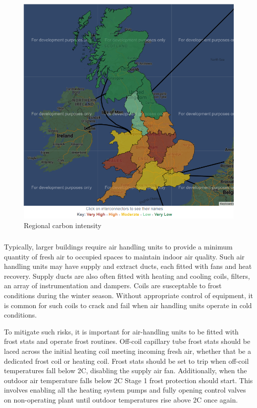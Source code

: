 \documentclass[11pt, oneside]{book}   	%
\begin{document}
\FloatBarrier
\begin{figure}[h]
\begin{center}
\includegraphics[width=1\textwidth]{regionalCarbonIntensity.png}
\caption{Regional carbon intensity}
\label{Regional Carbon Intensity figure}
\end{center}
\end{figure}
\FloatBarrier

\pagebreak

\subsubsection{\color{YellowOrange}{P2: Air Handling Unit Coil Failure During Frosts}}
Typically, larger buildings require air handling units to provide a minimum quantity of fresh air to occupied spaces to maintain indoor air quality.
Such air handling units may have supply and extract ducts, each fitted with fans and heat recovery.
Supply ducts are also often fitted with heating and cooling coils, filters, an array of instrumentation and dampers.
Coils are susceptable to frost conditions during the winter season.
Without appropriate control of equipment, it is common for such coils to crack and fail when air handling units operate in cold conditions.\

To mitigate such risks, it is important for air-handling units to be fitted with frost stats and operate frost routines.
Off-coil capillary tube frost stats should be laced across the initial heating coil meeting incoming fresh air, whether that be a dedicated frost coil or heating coil.
Frost stats should be set to trip when off-coil temperatures fall below 2\textdegree C, disabling the supply air fan.
Additionally, when the outdoor air temperature falls below 2\textdegree C Stage 1 frost protection should start.
This involves enabling all the heating system pumps and fully opening control valves on non-operating plant until outdoor temperatures rise above 2\textdegree C once again.\
\end{document}
